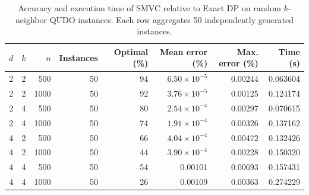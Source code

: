 \begin{table}[t]
\centering
\caption{Accuracy and execution time of SMVC relative to Exact DP on random $k$-neighbor QUDO instances. Each row aggregates 50 independently generated instances.}
\label{tab:experiment-1-accuracy}
\begin{tabular}{rrrrrrrr}
\toprule
$d$ & $k$ & $n$ & Instances & Optimal (\%) & Mean error (\%) & Max. error (\%) & Time (s) \\
\midrule
2 & 2 & 500 & 50 & 94 & $6.50 \times 10^{-5}$ & 0.00244 & 0.063604 \\
2 & 2 & 1000 & 50 & 92 & $3.76 \times 10^{-5}$ & 0.00125 & 0.124174 \\
2 & 4 & 500 & 50 & 80 & $2.54 \times 10^{-4}$ & 0.00297 & 0.070615 \\
2 & 4 & 1000 & 50 & 74 & $1.91 \times 10^{-4}$ & 0.00326 & 0.137162 \\
4 & 2 & 500 & 50 & 66 & $4.04 \times 10^{-4}$ & 0.00472 & 0.132426 \\
4 & 2 & 1000 & 50 & 44 & $3.90 \times 10^{-4}$ & 0.00228 & 0.150320 \\
4 & 4 & 500 & 50 & 54 & 0.00101 & 0.00693 & 0.157431 \\
4 & 4 & 1000 & 50 & 26 & 0.00109 & 0.00363 & 0.274229 \\
\bottomrule
\end{tabular}
\end{table}
